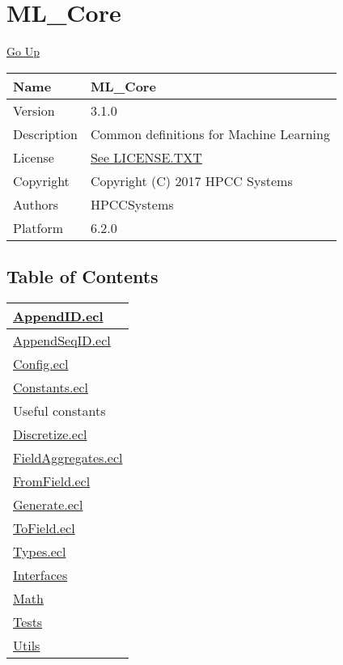 \chapter*{\color{headtoc} ML\_Core}
\hypertarget{ecldoc:toc:root/ML_Core}{}
\hyperlink{ecldoc:toc:root}{Go Up}

\begin{tabularx}{\textwidth}{|l|X|}
\hline
Name &
ML\_Core
 \\
\hline
Version &
3.1.0
 \\
\hline
Description &
Common definitions for Machine Learning
 \\
\hline
License &
\url{See LICENSE.TXT}
 \\
\hline
Copyright &
Copyright (C) 2017 HPCC Systems
 \\
\hline
Authors &
HPCCSystems
 \\
\hline
Platform &
6.2.0
 \\
\hline
\end{tabularx}

\section*{Table of Contents}
{\renewcommand{\arraystretch}{1.5}
\begin{longtable}{|p{\textwidth}|}
\hline
\hyperlink{ecldoc:toc:ML_Core.AppendID}{AppendID.ecl} \\
\hline
\hyperlink{ecldoc:toc:ML_Core.AppendSeqID}{AppendSeqID.ecl} \\
\hline
\hyperlink{ecldoc:toc:ML_Core.Config}{Config.ecl} \\
\hline
\hyperlink{ecldoc:toc:ML_Core.Constants}{Constants.ecl} \\
Useful constants \\
\hline
\hyperlink{ecldoc:toc:ML_Core.Discretize}{Discretize.ecl} \\
\hline
\hyperlink{ecldoc:toc:ML_Core.FieldAggregates}{FieldAggregates.ecl} \\
\hline
\hyperlink{ecldoc:toc:ML_Core.FromField}{FromField.ecl} \\
\hline
\hyperlink{ecldoc:toc:ML_Core.Generate}{Generate.ecl} \\
\hline
\hyperlink{ecldoc:toc:ML_Core.ToField}{ToField.ecl} \\
\hline
\hyperlink{ecldoc:toc:ML_Core.Types}{Types.ecl} \\
\hline
\hyperlink{ecldoc:toc:root/ML_Core/Interfaces}{Interfaces} \\
\hline
\hyperlink{ecldoc:toc:root/ML_Core/Math}{Math} \\
\hline
\hyperlink{ecldoc:toc:root/ML_Core/Tests}{Tests} \\
\hline
\hyperlink{ecldoc:toc:root/ML_Core/Utils}{Utils} \\
\hline
\end{longtable}
}

